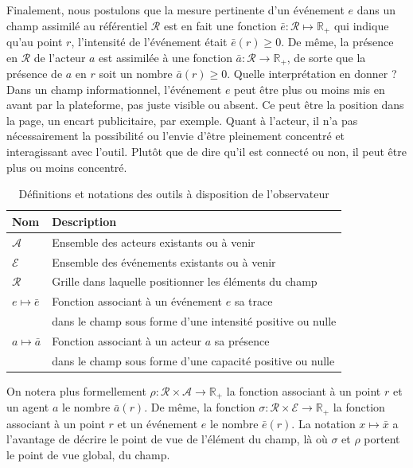 \documentclass[11pt]{article}
\begin{document}
			Finalement, nous postulons que la mesure pertinente d'un événement $e$ dans un champ assimilé au référentiel $\mathcal{R}$ est en fait une fonction $\bar{e} : \mathcal{R} \mapsto \mathbb{R}_+$ qui indique qu'au point $r$, l'intensité de l'événement était $\bar{e}(r) \ge 0$. De même, la présence en $\mathcal{R}$ de l'acteur $a$ est assimilée à une fonction $\bar{a} : \mathcal{R} \rightarrow \mathbb{R}_+$, de sorte que la présence de $a$ en $r$ soit un nombre $\bar{a}(r) \ge 0$. Quelle interprétation en donner ? Dans un champ informationnel, l'événement $e$ peut être plus ou moins mis en avant par la plateforme, pas juste visible ou absent. Ce peut être la position dans la page, un encart publicitaire, par exemple. Quant à l'acteur, il n'a pas nécessairement la possibilité ou l'envie d'être pleinement concentré et interagissant avec l'outil. Plutôt que de dire qu'il est connecté ou non, il peut être plus ou moins concentré. 
			\begin{table}[H]
				\centering
				\begin{tabular}{|l|l|}
					\hline 
					Nom & Description \\
					\hline 
					$\mathcal{A}$ & Ensemble des acteurs existants ou à venir \\
					\hline 
					$\mathcal{E}$ & Ensemble des événements existants ou à venir \\
					\hline 
					$\mathcal{R}$ & Grille dans laquelle positionner les éléments du champ \\
					\hline 
					$e \mapsto \bar{e}$ & Fonction associant à un événement $e$ sa trace \\
					& dans le champ sous forme d'une intensité positive ou nulle \\
					\hline 
					$a \mapsto \bar{a}$ & Fonction associant à un acteur $a$ sa présence \\
					& dans le champ sous forme d'une capacité positive ou nulle \\
					\hline 
				\end{tabular}
				\caption{Définitions et notations des outils à disposition de l'observateur}
			\end{table}
			
			On notera plus formellement $\rho : \mathcal{R} \times \mathcal{A} \rightarrow \mathbb{R}_+$ la fonction associant à un point $r$ et un agent $a$ le nombre $\bar{a}(r)$. De même, la fonction $\sigma : \mathcal{R} \times \mathcal{E} \rightarrow \mathbb{R}_+$   la fonction associant à un point $r$ et un événement $e$ le nombre $\bar{e}(r)$. La notation $x \mapsto \bar{x}$ a l'avantage de décrire le point de vue de l'élément du champ, là où $\sigma$ et $\rho$ portent le point de vue global, du champ. 
			
\end{document}
